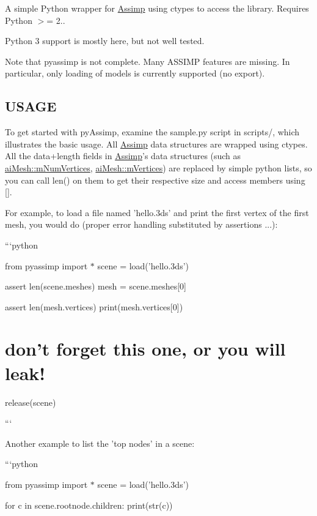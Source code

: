A simple Python wrapper for \hyperlink{class_assimp}{Assimp} using {\ttfamily ctypes} to access the library. Requires Python $>$= 2..

Python 3 support is mostly here, but not well tested.

Note that pyassimp is not complete. Many A\+S\+S\+I\+M\+P features are missing. In particular, only loading of models is currently supported (no export).

\subsection*{U\+S\+A\+G\+E }

To get started with py\+Assimp, examine the {\ttfamily sample.\+py} script in {\ttfamily scripts/}, which illustrates the basic usage. All \hyperlink{class_assimp}{Assimp} data structures are wrapped using ctypes. All the data+length fields in \hyperlink{class_assimp}{Assimp}'s data structures (such as {\ttfamily \hyperlink{structai_mesh_ab34b7b5941e6636f1c08f615cbb072ef}{ai\+Mesh\+::m\+Num\+Vertices}}, {\ttfamily \hyperlink{structai_mesh_afd4588abb3e1c72821ae0234a3850662}{ai\+Mesh\+::m\+Vertices}}) are replaced by simple python lists, so you can call len() on them to get their respective size and access members using \mbox{[}\mbox{]}.

For example, to load a file named 'hello.\+3ds' and print the first vertex of the first mesh, you would do (proper error handling substituted by assertions ...)\+:

```python

from pyassimp import $\ast$ scene = load('hello.\+3ds')

assert len(scene.\+meshes) mesh = scene.\+meshes\mbox{[}0\mbox{]}

assert len(mesh.\+vertices) print(mesh.\+vertices\mbox{[}0\mbox{]})

\section*{don't forget this one, or you will leak!}

release(scene)

```

Another example to list the 'top nodes' in a scene\+:

```python

from pyassimp import $\ast$ scene = load('hello.\+3ds')

for c in scene.\+rootnode.\+children\+: print(str(c))

